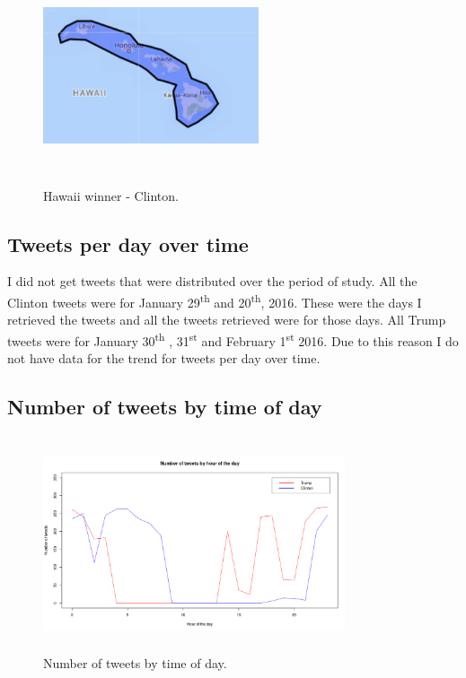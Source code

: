 \documentclass{sig-alternate-05-2015}
\begin{document}
\begin{figure}
\centering
\includegraphics[width=2.5in, height=2.5in]{Hawaii.png}
\caption{Hawaii winner - Clinton.}
\label{Hawaii}
\end{figure}

\subsection{Tweets per day over time}
I did not get tweets that were distributed over the period of study. All the Clinton tweets were for January 29\textsuperscript{th} and 20\textsuperscript{th}, 2016. These were the days I retrieved the tweets and all the tweets retrieved were for those days. All Trump tweets were for January 30\textsuperscript{th} , 31\textsuperscript{st} and February 1\textsuperscript{st} 2016. Due to this reason I do not have data for the trend for tweets per day over time.

\subsection{Number of tweets by time of day}

\begin{figure}
\centering
\includegraphics[width=3.5in, height=2.5in]{TweetsByHour.png}
\caption{Number of tweets by time of day.}
\label{TweetTime}
\end{figure}
\end{document}
